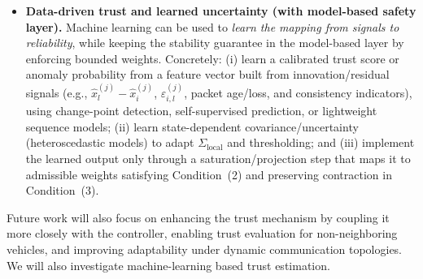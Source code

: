 \begin{itemize}
    \medskip
    \noindent\emph{Contamination rollback (compact recipe).}
    If a neighbor $l^{\star}$ is flagged at time $t$, undo the last $K$ steps by keeping a buffer of the \emph{innovation terms} appearing in~\eqref{eq_DO}. For each step $k$, store $\hat{x}_i^{(j)}(k)$ and
    \begin{align*}
    \eta_{il}^{(j)}(k) &\triangleq w_{il}^{(j)}(k)\big(\hat{x}_l^{(j)}(k)-\hat{x}_i^{(j)}(k)\big),\quad l\in\mathcal{N}_i,\\
    \eta_{i0}^{(j)}(k) &\triangleq w_{i0}^{(j)}(k)\big(\hat{x}_0^{(j)}(k)-\hat{x}_i^{(j)}(k)\big),
    \end{align*}
    as well as the input term $\hat{u}_j(k)$. When $l^{\star}$ is flagged, set $x\leftarrow\hat{x}_i^{(j)}(t-K)$ and replay for $k=t-K,\ldots,t-1$ using the same observer update but excluding $l^{\star}$ (or a malicious set $\mathcal{M}$):
    \begin{equation*}
    x \leftarrow A_{\text{b}}\Big(x + \sum_{l\in\mathcal{N}_i\setminus\mathcal{M}} \eta_{il}^{(j)}(k) + \eta_{i0}^{(j)}(k)\Big) + B_{\text{b}}\hat{u}_j(k),
    \end{equation*}
    and finally set $\hat{x}_i^{(j)}(t)\leftarrow x$.

    \item \textbf{Data-driven trust and learned uncertainty (with model-based safety layer).}
    Machine learning can be used to \emph{learn the mapping from signals to reliability}, while keeping the stability guarantee in the model-based layer by enforcing bounded weights. Concretely: (i) learn a calibrated trust score or anomaly probability from a feature vector built from innovation/residual signals (e.g., $\hat{x}_l^{(j)}-\hat{x}_i^{(j)}$, $\varepsilon_{i,l}^{(j)}$, packet age/loss, and consistency indicators), using change-point detection, self-supervised prediction, or lightweight sequence models; (ii) learn state-dependent covariance/uncertainty (heteroscedastic models) to adapt $\Sigma_{\text{local}}$ and thresholding; and (iii) implement the learned output only through a saturation/projection step that maps it to admissible weights satisfying Condition~(2) and preserving contraction in Condition~(3).
\end{itemize}

Future work will also focus on enhancing the trust mechanism by coupling it more closely with the controller, enabling trust evaluation for non-neighboring vehicles, and improving adaptability under dynamic communication topologies. 
We will also investigate machine-learning based trust estimation.
